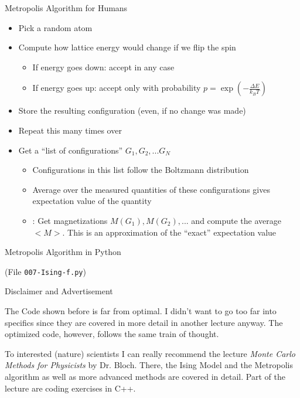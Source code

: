 
\begin{frame}{Metropolis Algorithm for Humans}
%
\begin{itemize}
\item Pick a random atom
\item Compute how lattice energy would change if we flip the spin
	\begin{itemize}
	\item If energy goes down: accept in any case
	\item If energy goes up: accept only with probability $p = \exp(-\frac{\Delta E}{k_B T})$
	\end{itemize}
\item Store the resulting configuration (even, if no change was made)
\item Repeat this many times over
\item[\Thus] Get a \enquote{list of configurations} $G_1, G_2, ... G_N$
	\begin{itemize}
	\item Configurations in this list follow the Boltzmann distribution
	\item Average over the measured quantities of these configurations gives expectation value of the quantity
	\item \eg: Get magnetizations $M(G_1), M(G_2), ...$ and compute the average $<M>$. This is an approximation of the \enquote{exact} expectation value
	\end{itemize}
\end{itemize}
%
\end{frame}


\begin{frame}{Metropolis Algorithm in Python}
%
\begin{center}
(File \texttt{007-Ising-f.py})
\end{center}
%
\end{frame}


\begin{frame}{Disclaimer and Advertisement}
%
\begin{hintbox}
The Code shown before is far from optimal. I didn't want to go too far into specifics since they are covered in more detail in another lecture anyway. The optimized code, however, follows the same train of thought.

To interested (nature) scientists I can really recommend the lecture \emph{Monte Carlo Methods for Physicists} by Dr. Bloch. There, the Ising Model and the Metropolis algorithm as well as more advanced methods are covered in detail. Part of the lecture are coding exercises in C++.
\end{hintbox}
%
\end{frame}
